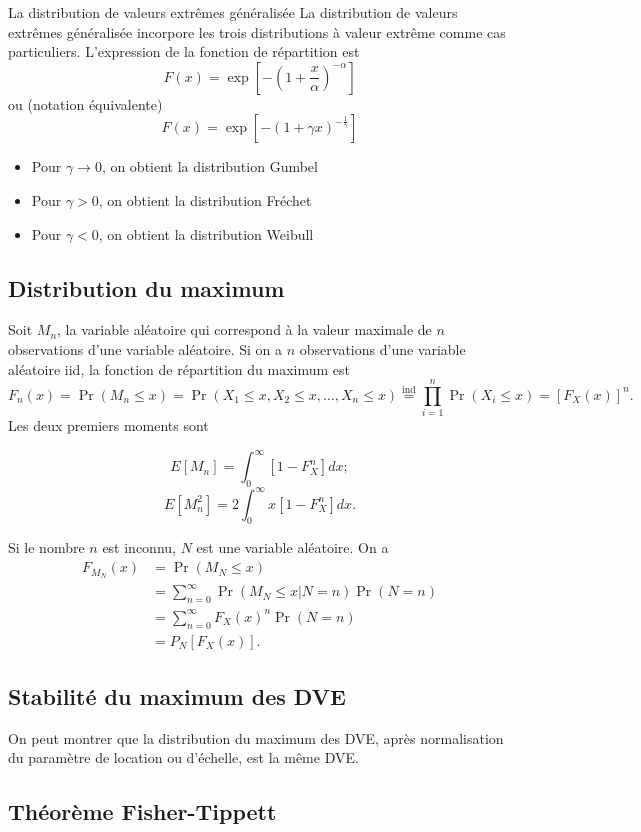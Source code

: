 \begin{definition}{La distribution de valeurs extrêmes généralisée}{}
	La distribution de valeurs extrêmes généralisée incorpore les trois distributions à valeur extrême comme cas particuliers. L'expression de la fonction de répartition est 
	$$F(x) = \exp \left[-\left(1 + \frac{x}{\alpha}\right)^{-\alpha}\right]$$
	ou (notation équivalente)
	$$F(x) = \exp \left[-\left(1 + \gamma x\right)^{-\frac{1}{\gamma}}\right]$$
	\tcblower
	\begin{itemize}
		\item Pour $\gamma \to 0$, on obtient la distribution Gumbel
		\item Pour $\gamma  > 0$, on obtient la distribution Fréchet
		\item Pour $\gamma < 0$, on obtient la distribution Weibull
	\end{itemize}
\end{definition}

\subsection{Distribution du maximum}

Soit $M_{n}$, la variable aléatoire qui correspond à la valeur maximale de $n$ observations d'une variable aléatoire. Si on a $n$ observations d'une variable aléatoire iid, la fonction de répartition du maximum est 
$$F_{n}(x) = \Pr(M_n \leq x) = \Pr(X_1\leq x, X_2 \leq x, \dots, X_n \leq x) \stackrel{\text{ind}}{=} \prod_{i = 1}^{n} \Pr(X_i\leq x) = \left[F_{X}(x)\right]^n.$$
Les deux premiers moments sont

$$E\left[M_n\right] = \int_{0}^{\infty} [1 - F_{X}^n] dx;$$
$$E\left[M_n^2\right] = 2\int_{0}^{\infty} x[1 - F_{X}^n] dx.$$

Si le nombre $n$ est inconnu, $N$ est une variable aléatoire. On a 
\begin{align*}
F_{M_{N}}(x) &= \Pr(M_{N} \leq x) \\
&= \sum_{n = 0}^{\infty} \Pr(M_{N} \leq x \vert N = n) \Pr(N = n)\\
&= \sum_{n = 0}^{\infty} F_X(x)^n \Pr(N = n)\\
&= P_N\left[F_{X}(x)\right].
\end{align*}

\subsection{Stabilité du maximum des DVE}

On peut montrer que la distribution du maximum des DVE, après normalisation du paramètre de location ou d'échelle, est la même DVE.

\subsection{Théorème Fisher-Tippett}












